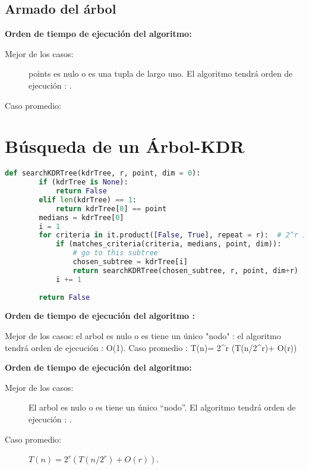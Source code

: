 \subsection{Armado del árbol}



\textbf{Orden de tiempo de ejecución del algoritmo:}
\begin{description}
\item[Mejor de los casos:] points es nulo o es una tupla de largo uno.
  El algoritmo tendrá orden de ejecución : .
\item[Caso promedio:] 
\end{description}



	\section{Búsqueda de un Árbol-KDR}
	\begin{lstlisting}[language=Python]
	def searchKDRTree(kdrTree, r, point, dim = 0):
		if (kdrTree is None):
			return False
		elif len(kdrTree) == 1:
			return kdrTree[0] == point
		medians = kdrTree[0]
		i = 1
		for criteria in it.product([False, True], repeat = r):  # 2^r iteraciones
			if (matches_criteria(criteria, medians, point, dim)):
				# go to this subtree
				chosen_subtree = kdrTree[i]
				return searchKDRTree(chosen_subtree, r, point, dim+r)
			i += 1
	
		return False
		\end{lstlisting}
	\textbf{ Orden de tiempo de ejecución del algoritmo : }
		{Mejor de los casos: el arbol es nulo o es tiene un único "nodo" : 
		el algoritmo tendrá orden de ejecución : O(1).
		Caso promedio : T(n)= 2^r (T(n/2^r)+ O(r))
		
		
		
		}



\textbf{Orden de tiempo de ejecución del algoritmo:}
\begin{description}
\item[Mejor de los casos:] El arbol es nulo o es tiene un único ``nodo''.
  El algoritmo tendrá orden de ejecución : .
\item[Caso promedio:] \(T(n)= 2^r (T(n/2^r)+ O(r))\).
\end{description}

